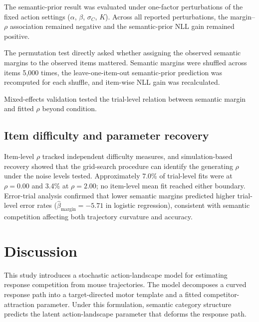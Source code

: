 \documentclass[11pt,final]{article}
\begin{document}
The semantic-prior result was evaluated under one-factor perturbations of the fixed action settings ($\alpha$, $\beta$, $\sigma_C$, $K$). Across all reported perturbations, the margin--$\rho$ association remained negative and the semantic-prior NLL gain remained positive.



The permutation test directly asked whether assigning the observed semantic margins to the observed items mattered. Semantic margins were shuffled across items 5,000 times, the leave-one-item-out semantic-prior prediction was recomputed for each shuffle, and item-wise NLL gain was recalculated.



Mixed-effects validation tested the trial-level relation between semantic margin and fitted $\rho$ beyond condition.



\subsection{Item difficulty and parameter recovery}

Item-level $\rho$ tracked independent difficulty measures, and simulation-based recovery showed that the grid-search procedure can identify the generating $\rho$ under the noise levels tested. Approximately 7.0\% of trial-level fits were at $\rho = 0.00$ and 3.4\% at $\rho = 2.00$; no item-level mean fit reached either boundary. Error-trial analysis confirmed that lower semantic margins predicted higher trial-level error rates ($\hat{\beta}_{\mathrm{margin}} = -5.71$ in logistic regression), consistent with semantic competition affecting both trajectory curvature and accuracy.



\clearpage
\section{Discussion}

This study introduces a stochastic action-landscape model for estimating response competition from mouse trajectories. The model decomposes a curved response path into a target-directed motor template and a fitted competitor-attraction parameter. Under this formulation, semantic category structure predicts the latent action-landscape parameter that deforms the response path.
\end{document}
